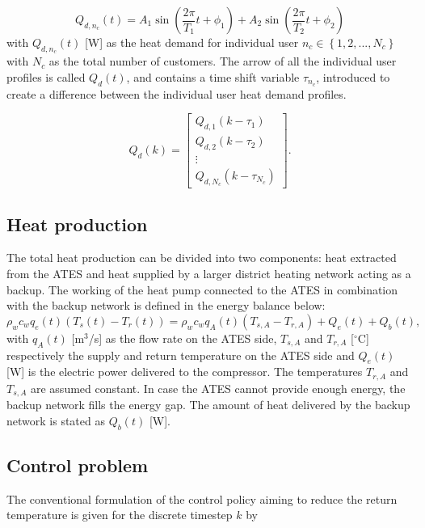\begin{equation}
Q_{d,n_c}(t)=A_1 \sin(\frac{2 \pi}{T_1} t + \phi_1) + A_2\sin(\frac{2 \pi}{T_2} t + \phi_2)
\end{equation}
with $Q_{d,n_c}(t)$ [W] as the heat demand for individual user $n_c \in \left\{1,2,...,N_c \right\}$ with $N_c$ as the total number of customers. The arrow of all the individual user profiles is called $Q_d(t)$, and contains a time shift variable $\tau_{n_c}$, introduced to create a difference between the individual user heat demand profiles.

\begin{equation}
Q_d(k) = 
\left[\begin{array}{c}
Q_{d,1}(k-\tau_1) \\
Q_{d,2}(k-\tau_2) \\
\vdots \\
Q_{d,N_c}(k - \tau_{N_c})
\end{array}\right].
\end{equation}

\subsection{Heat production}
The total heat production can be divided into two components: heat extracted from the ATES and heat supplied by a larger district heating network acting as a backup. The working of the heat pump connected to the ATES in combination with the backup network is defined in the energy balance below:
\begin{equation}
    \rho_w c_w q_e(t) \left(T_s(t) - T_r(t)\right) = \rho_w c_w q_{A}(t)\left(T_{s,A} - T_{r,A}\right) + Q_e(t) + Q_{b}(t),
\end{equation}
with $q_A(t)$ [m$^3$/s] as the flow rate on the ATES side, $T_{s,A}$ and $T_{r,A}$ [$^{\circ}\text{C}$] respectively the supply and return temperature on the ATES side and $Q_e(t)$ [W] is the electric power delivered to the compressor. The temperatures $T_{r,A}$ and $T_{s,A}$ are assumed constant. In case the ATES cannot provide enough energy, the backup network fills the energy gap. The amount of heat delivered by the backup network is stated as $Q_{b}(t)$ [W].

\subsection{Control problem}
The conventional formulation of the control policy aiming to reduce the return temperature is given for the discrete timestep $k$ by


